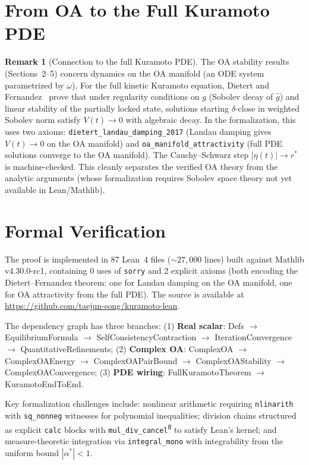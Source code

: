 \documentclass[12pt]{article}
\theoremstyle{definition}
\newtheorem{remark}[theorem]{Remark}
\begin{document}
\section{From OA to the Full Kuramoto PDE}

\begin{remark}[Connection to the full Kuramoto PDE]\label{rem:full_pde}
The OA stability results (Sections~2--5) concern dynamics on the
OA manifold (an ODE system parametrized by $\omega$).  For the full kinetic Kuramoto equation, Dietert and
Fernandez~\cite{dietert2018} prove that under regularity conditions on $g$
(Sobolev decay of $\hat g$) and linear stability of the partially locked state,
solutions starting $\delta$-close in weighted Sobolev norm satisfy
$V(t) \to 0$ with algebraic decay.  In the formalization, this uses two axioms:
\texttt{dietert\_landau\_damping\_2017} (Landau damping gives $V(t) \to 0$
on the OA manifold) and \texttt{oa\_manifold\_attractivity}
(full PDE solutions converge to the OA manifold).
The Cauchy--Schwarz step $|\eta(t)| \to r^*$ is machine-checked.
This cleanly separates the verified OA theory from the analytic
arguments (whose formalization requires Sobolev space theory not
yet available in Lean/Mathlib).
\end{remark}


\section{Formal Verification}

The proof is implemented in 87 Lean~4 files (${\sim}27{,}000$ lines)
built against Mathlib v4.30.0-rc1, containing 0 uses of \texttt{sorry}
and 2 explicit axioms (both encoding the Dietert--Fernandez theorem:
one for Landau damping on the OA manifold, one for OA attractivity
from the full PDE).
The source is available at
\url{https://github.com/taejun-song/kuramoto-lean}.

The dependency graph has three branches:
(1) \textbf{Real scalar}: Defs $\to$ EquilibriumFormula $\to$
SelfConsistencyContraction $\to$ IterationConvergence $\to$
QuantitativeRefinements;
(2) \textbf{Complex OA}: ComplexOA $\to$ ComplexOAEnergy $\to$
ComplexOAPairBound $\to$ ComplexOAStability $\to$ ComplexOAConvergence;
(3) \textbf{PDE wiring}: FullKuramotoTheorem $\to$ KuramotoEndToEnd.

Key formalization challenges include: nonlinear arithmetic requiring
\texttt{nlinarith} with \texttt{sq\_nonneg} witnesses for polynomial
inequalities; division chains structured as explicit \texttt{calc} blocks
with \texttt{mul\_div\_cancel\textsuperscript{0}} to satisfy Lean's
kernel; and measure-theoretic integration via \texttt{integral\_mono}
with integrability from the uniform bound $|\alpha^*| < 1$.
\end{document}
